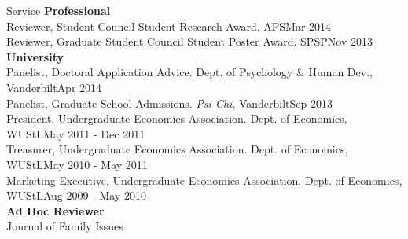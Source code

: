 \documentclass {resume}
\begin{document}
\begin{rSection}{\textrm{Service}}
{\large \textbf{Professional}}\\
Reviewer, Student Council Student Research Award. APS\hfill {Mar 2014}\smallskip\\
Reviewer, Graduate Student Council Student Poster Award. SPSP\hfill {Nov 2013}\medskip\\
{\large \textbf{University}}\\
Panelist, Doctoral Application Advice. Dept. of Psychology \& Human Dev., Vanderbilt\hfill {Apr 2014}\smallskip\\
Panelist, Graduate School Admissions. \textit{Psi Chi}, Vanderbilt\hfill {Sep 2013}\smallskip\\
President, Undergraduate Economics Association. Dept. of Economics, WUStL\hfill  {May 2011 - Dec 2011}\smallskip\\
Treasurer, Undergraduate Economics Association. Dept. of Economics, WUStL\hfill  {May 2010 - May 2011}\smallskip\\
Marketing Executive, Undergraduate Economics Association. Dept. of Economics, WUStL\hfill  {Aug 2009 - May 2010}\medskip\\
{\large \textbf{Ad Hoc Reviewer}}\\
Journal of Family Issues
\end{rSection}
\end{document}
